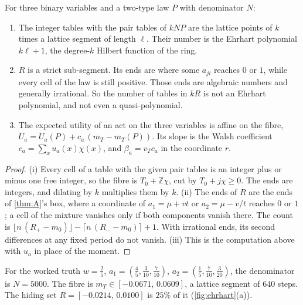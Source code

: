 \begin{proposition}\label{prop:ehrhart}
For three binary variables and a two-type law $P$ with denominator $N$:
\begin{enumerate}
\item[(i)] The integer tables with the pair tables of $kNP$ are the lattice points of $k$ times a lattice segment of length $\ell$. Their
number is the Ehrhart polynomial $k\ell+1$, the degree-$k$ Hilbert function of the ring.
\item[(ii)] $R$ is a strict sub-segment. Its ends are where some $a_{ji}$ reaches $0$ or $1$, while every cell of the law is still
positive. Those ends are algebraic numbers and generally irrational. So the number of tables in $kR$ is not an Ehrhart polynomial, and
not even a quasi-polynomial.
\item[(iii)] The expected utility of an act on the three variables is affine on the fibre, $U_a=U_a(P)+c_a\,(m_T-m_T(P))$. Its slope is
the Walsh coefficient $c_a=\sum_xu_a(x)\chi(x)$, and $\beta_a=v_Tc_a$ in the coordinate $r$.
\end{enumerate}
\end{proposition}

\begin{proof}
(i) Every cell of a table with the given pair tables is an integer plus or minus one free integer, so the fibre is $T_0+\mathbb Z\chi$,
cut by $T_0+j\chi\ge0$. The ends are integers, and dilating by $k$ multiplies them by $k$. (ii) The ends of $R$ are the ends of
\cref{thm:A}'s box, where a coordinate of $a_1=\mu+vt$ or $a_2=\mu-v/t$ reaches $0$ or $1$; a cell of the mixture vanishes only if both
components vanish there. The count is $\lfloor n\,(R_+-m_0)\rfloor-\lceil n\,(R_--m_0)\rceil+1$. With irrational ends, its second
differences at any fixed period do not vanish. (iii) This is the computation above with $u_a$ in place of the moment.
\end{proof}

For the worked truth $w=\tfrac25$, $a_1=(\tfrac45,\tfrac3{10},\tfrac7{10})$, $a_2=(\tfrac15,\tfrac7{10},\tfrac3{20})$, the denominator is
$N=5000$. The fibre is $m_T\in[-0.0671,\,0.0609]$, a lattice segment of 640 steps. The hiding set $R=[-0.0214,\,0.0100]$ is $25\%$ of
it (\cref{fig:ehrhart}(a)).

